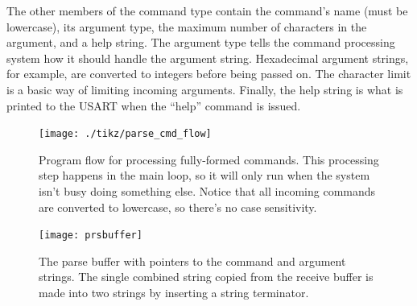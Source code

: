 The other members of the command type contain the command's name (must be lowercase), its argument type, the maximum number of characters in the argument, and a help string.  The argument type tells the command processing system how it should handle the argument string.  Hexadecimal argument strings, for example, are converted to integers before being passed on.  The character limit is a basic way of limiting incoming arguments.  Finally, the help string is what is printed to the USART when the ``help'' command is issued.


\begin{figure}[ht]
    \begin{center}
        \texttt{[image: ./tikz/parse\_cmd\_flow]}
        \caption{Program flow for processing fully-formed commands.  This processing step happens in the main loop, so it will only run when the system isn't busy doing something else.  Notice that all incoming commands are converted to lowercase, so there's no case sensitivity.\label{fig:cmdflow}}
    \end{center}
\end{figure}

\begin{figure}[ht]
    \begin{center}
        \texttt{[image: prsbuffer]}
        \caption{The parse buffer with pointers to the command and argument strings.  The single combined string copied from the receive buffer is made into two strings by inserting a string terminator.\label{fig:prsbuffer}}
    \end{center}
\end{figure}

